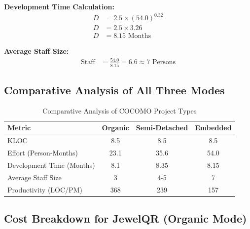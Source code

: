 \documentclass[12pt,a4paper]{article}
\begin{document}
\textbf{Development Time Calculation:}
\begin{align}
D &= 2.5 \times (54.0)^{0.32} \\
D &= 2.5 \times 3.26 \\
D &= \boxed{8.15 \text{ Months}}
\end{align}

\textbf{Average Staff Size:}
\begin{align}
\text{Staff} &= \frac{54.0}{8.15} = \boxed{6.6 \approx 7 \text{ Persons}}
\end{align}

\subsection{Comparative Analysis of All Three Modes}

\begin{table}[H]
\centering
\begin{tabular}{|l|c|c|c|}
\hline
\textbf{Metric} & \textbf{Organic} & \textbf{Semi-Detached} & \textbf{Embedded} \\
\hline
KLOC & 8.5 & 8.5 & 8.5 \\
\hline
Effort (Person-Months) & 23.1 & 35.6 & 54.0 \\
\hline
Development Time (Months) & 8.1 & 8.35 & 8.15 \\
\hline
Average Staff Size & 3 & 4-5 & 7 \\
\hline
Productivity (LOC/PM) & 368 & 239 & 157 \\
\hline
\end{tabular}
\caption{Comparative Analysis of COCOMO Project Types}
\end{table}

\subsection{Cost Breakdown for JewelQR (Organic Mode)}
\end{document}
